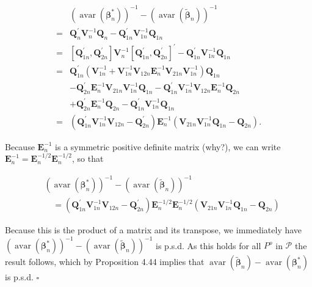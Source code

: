 \documentclass[10pt]{article}
\begin{document}
$$
\begin{aligned}
& \left(\operatorname{avar}\left(\boldsymbol{\beta}_{n}^{*}\right)\right)^{-1}-\left(\operatorname{avar}\left(\tilde{\boldsymbol{\beta}}_{n}\right)\right)^{-1} \\
= & \mathbf{Q}_{n}^{\prime} \mathbf{V}_{n}^{-1} \mathbf{Q}_{n}-\mathbf{Q}_{1 n}^{\prime} \mathbf{V}_{1 n}^{-1} \mathbf{Q}_{1 n} \\
= & {\left[\mathbf{Q}_{1 n}^{\prime}, \mathbf{Q}_{2 n}^{\prime}\right] \mathbf{V}_{n}^{-1}\left[\mathbf{Q}_{1 n}^{\prime}, \mathbf{Q}_{2 n}^{\prime}\right]^{\prime}-\mathbf{Q}_{1 n}^{\prime} \mathbf{V}_{1 n}^{-1} \mathbf{Q}_{1 n} } \\
= & \mathbf{Q}_{1 n}^{\prime}\left(\mathbf{V}_{1 n}^{-1}+\mathbf{V}_{1 n}^{-1} \mathbf{V}_{12 n} \mathbf{E}_{n}^{-1} \mathbf{V}_{21 n} \mathbf{V}_{1 n}^{-1}\right) \mathbf{Q}_{1 n} \\
& -\mathbf{Q}_{2 n}^{\prime} \mathbf{E}_{n}^{-1} \mathbf{V}_{21 n} \mathbf{V}_{1 n}^{-1} \mathbf{Q}_{1 n}-\mathbf{Q}_{1 n}^{\prime} \mathbf{V}_{1 n}^{-1} \mathbf{V}_{12 n} \mathbf{E}_{n}^{-1} \mathbf{Q}_{2 n} \\
& +\mathbf{Q}_{2 n}^{\prime} \mathbf{E}_{n}^{-1} \mathbf{Q}_{2 n}-\mathbf{Q}_{1 n}^{\prime} \mathbf{V}_{1 n}^{-1} \mathbf{Q}_{1 n} \\
= & \left(\mathbf{Q}_{1 n}^{\prime} \mathbf{V}_{1 n}^{-1} \mathbf{V}_{12 n}-\mathbf{Q}_{2 n}^{\prime}\right) \mathbf{E}_{n}^{-1}\left(\mathbf{V}_{21 n} \mathbf{V}_{1 n}^{-1} \mathbf{Q}_{1 n}-\mathbf{Q}_{2 n}\right) .
\end{aligned}
$$

Because $\mathbf{E}_{n}^{-1}$ is a symmetric positive definite matrix (why?), we can write $\mathbf{E}_{n}^{-1}=\mathbf{E}_{n}^{-1 / 2} \mathbf{E}_{n}^{-1 / 2}$, so that

$$
\begin{aligned}
& \left(\operatorname{avar}\left(\boldsymbol{\beta}_{n}^{*}\right)\right)^{-1}-\left(\operatorname{avar}\left(\tilde{\boldsymbol{\beta}}_{n}\right)\right)^{-1} \\
& \quad=\left(\mathbf{Q}_{1 n}^{\prime} \mathbf{V}_{1 n}^{-1} \mathbf{V}_{12 n}-\mathbf{Q}_{2 n}^{\prime}\right) \mathbf{E}_{n}^{-1 / 2} \mathbf{E}_{n}^{-1 / 2}\left(\mathbf{V}_{21 n} \mathbf{V}_{1 n}^{-1} \mathbf{Q}_{1 n}-\mathbf{Q}_{2 n}\right)
\end{aligned}
$$

Because this is the product of a matrix and its transpose, we immediately have $\left(\operatorname{avar}\left(\boldsymbol{\beta}_{n}^{*}\right)\right)^{-1}-\left(\operatorname{avar}\left(\tilde{\boldsymbol{\beta}}_{n}\right)\right)^{-1}$ is p.s.d. As this holds for all $P^{o}$ in $\mathcal{P}$ the result follows, which by Proposition 4.44 implies that $\operatorname{avar}\left(\tilde{\boldsymbol{\beta}}_{n}\right)-\operatorname{avar}\left(\boldsymbol{\beta}_{n}^{*}\right)$ is p.s.d. \(\square\)
\end{document}
